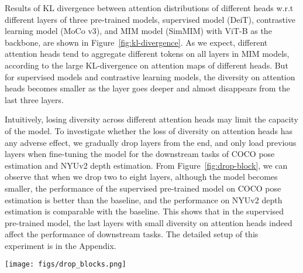 \documentclass{article}
\begin{document}
Results of KL divergence between attention distributions of different heads w.r.t different layers of three pre-trained models, supervised model (DeiT), contrastive learning model (MoCo v3), and MIM model (SimMIM) with ViT-B as the backbone, are shown in Figure~\ref{fig:kl-divergence}. As we expect, different attention heads tend to aggregate different tokens on all layers in MIM models, according to the large KL-divergence on attention maps of different heads. But for supervised models and contrastive learning models, the diversity on attention heads becomes smaller as the layer goes deeper and almost disappears from the last three layers.

Intuitively, losing diversity across different attention heads may limit the capacity of the model. To investigate whether the loss of diversity on attention heads has any adverse effect, we gradually drop layers from the end, and only load previous layers when fine-tuning the model for the downstream tasks of COCO  pose estimation and NYUv2 depth estimation. From Figure~\ref{fig:drop-block}, we can observe that when we drop two to eight layers, although the model becomes smaller, the performance of the supervised pre-trained model on COCO  pose estimation is better than the baseline, and the performance on NYUv2 depth estimation is comparable with the baseline. This shows that in the supervised pre-trained model, the last layers with small diversity on attention heads indeed affect the performance of downstream tasks. The detailed setup of this experiment is in the Appendix.


\begin{figure*}
\centering
    \texttt{[image: figs/drop\_blocks.png]}
	    \vspace{-1.5em}
   \caption{The performance of the COCO  pose estimation (left) and NYUv2 depth estimation (right) when we drop several last layers of the SwinV2-B backbone. When the model becomes smaller, the performance of the supervised pre-trained model increases on the pose estimation and keeps the same on the depth estimation. The last layers in the supervised pre-trained model lose diversity across different attention heads and are harmful to the downstream tasks.
   }
\label{fig:drop-block}
\end{figure*}
\end{document}
